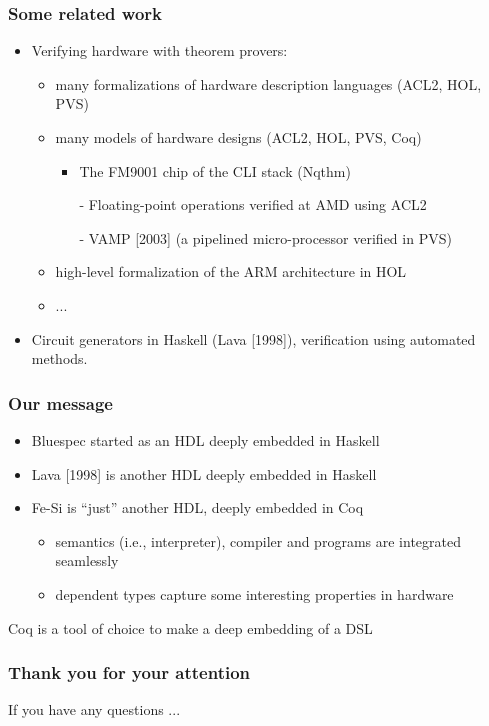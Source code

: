 \documentclass[9pt]{beamer}
\newcommand\fesi{Fe-Si}
\begin{document}
\begin{frame}
  \frametitle{Some related work}
  \begin{itemize}
  \item Verifying hardware with theorem provers:
    \begin{itemize}
    \item many formalizations of hardware description languages (ACL2, HOL, PVS)
    \item many models of hardware designs (ACL2, HOL, PVS, Coq)
      \begin{itemize}
      \item The FM9001 chip of the CLI stack (Nqthm)
      \item[-] Floating-point operations verified at AMD using ACL2
      \item[-] VAMP [2003] (a pipelined micro-processor verified in
        PVS)
      \end{itemize}
    \item high-level formalization of the ARM architecture in HOL
    \item ...
    \end{itemize}
  \item Circuit generators in Haskell (Lava [1998]), verification using
    automated methods. 
  \end{itemize}
\end{frame}

\begin{frame}
  \frametitle{Our message}
   
    \begin{itemize}
    \item Bluespec started as an HDL deeply embedded in Haskell
    \item Lava [1998] is another HDL deeply embedded in Haskell
    \item \fesi{} is ``just'' another HDL,  deeply embedded in \alert{Coq}
      \pause
      \begin{itemize}
      \item semantics (i.e., interpreter), compiler and programs are \alert{integrated seamlessly}
      \item dependent types capture some interesting properties in
        hardware
      \end{itemize}
    \end{itemize}

    \pause

    \begin{center}
      Coq is a tool of choice to make a deep embedding of a \alert{DSL}
    \end{center}
\end{frame}


\begin{frame}
  \frametitle{Thank you for your attention}
  
  \begin{center}

    \vspace{1cm}

    If you have any questions ... \\
  \end{center}
  
\end{frame}
\end{document}
